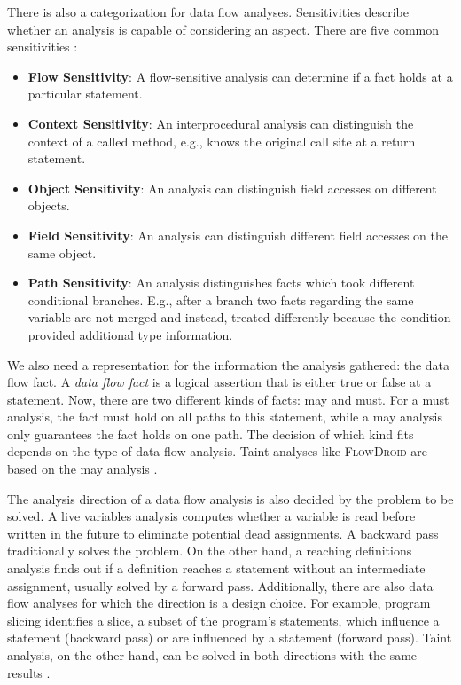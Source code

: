 \documentclass[../draft.tex]{subfiles}
\begin{document}
    There is also a categorization for data flow analyses.
    Sensitivities describe whether an analysis is capable of considering an aspect.
    There are five common sensitivities \cite{Li2017}:
    \begin{itemize}
        \item \textbf{Flow Sensitivity}: A flow-sensitive analysis can determine if a fact holds at a particular statement.
        \item \textbf{Context Sensitivity}: An interprocedural analysis can distinguish the context of a called method, e.g., knows the original call site at a return statement.
        \item \textbf{Object Sensitivity}: An analysis can distinguish field accesses on different objects.
        \item \textbf{Field Sensitivity}: An analysis can distinguish different field accesses on the same object.
        \item \textbf{Path Sensitivity}: An analysis distinguishes facts which took different conditional branches. E.g., after a branch two facts regarding the same variable are not merged and instead, treated differently because the condition provided additional type information.
    \end{itemize}

    We also need a representation for the information the analysis gathered: the data flow fact.
    A \textit{data flow fact} is a logical assertion that is either true or false at a statement.
    Now, there are two different kinds of facts: may and must.
    For a must analysis, the fact must hold on all paths to this statement, while a may analysis only guarantees the fact holds on one path.
    The decision of which kind fits depends on the type of data flow analysis.
    Taint analyses like \textsc{FlowDroid} are based on the may analysis \cite{Arzt2017PhD}.

    The analysis direction of a data flow analysis is also decided by the problem to be solved.
    A live variables analysis computes whether a variable is read before written in the future to eliminate potential dead assignments.
    A backward pass traditionally solves the problem.
    On the other hand, a reaching definitions analysis finds out if a definition reaches a statement without an intermediate assignment, usually solved by a forward pass.
    Additionally, there are also data flow analyses for which the direction is a design choice.
    For example, program slicing identifies a slice, a subset of the program's statements, which influence a statement (backward pass) or are influenced by a statement (forward pass).
    Taint analysis, on the other hand, can be solved in both directions with the same results \cite{Khedker2009}.
\end{document}
